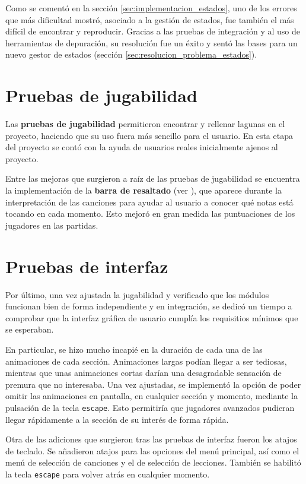 Como se comentó en la sección \ref{sec:implementacion_estados}, uno de los
errores que más dificultad mostró, asociado a la gestión de estados, fue también
el más difícil de encontrar y reproducir. Gracias a las pruebas de integración y
al uso de herramientas de depuración, su resolución fue un éxito y sentó las
bases para un nuevo gestor de estados (sección
\ref{sec:resolucion_problema_estados}).

\section{Pruebas de jugabilidad}
Las \textbf{pruebas de jugabilidad} permitieron encontrar y rellenar lagunas en
el proyecto, haciendo que su uso fuera más sencillo para el usuario. En esta
etapa del proyecto se contó con la ayuda de usuarios reales inicialmente ajenos
al proyecto.

Entre las mejoras que surgieron a raíz de las pruebas de jugabilidad se
encuentra la implementación de la \textbf{barra de resaltado} (ver
\textit{}), que aparece durante la interpretación
de las canciones para ayudar al usuario a conocer qué notas está tocando en cada
momento. Esto mejoró en gran medida las puntuaciones de los jugadores en las
partidas.

\section{Pruebas de interfaz}
Por último, una vez ajustada la jugabilidad y verificado que los módulos
funcionan bien de forma independiente y en integración, se dedicó un tiempo a
comprobar que la interfaz gráfica de usuario cumplía los requisitios mínimos que
se esperaban.

En particular, se hizo mucho incapié en la duración de cada una de las
animaciones de cada sección. Animaciones largas podían llegar a ser tediosas,
mientras que unas animaciones cortas darían una desagradable sensación de
premura que no interesaba. Una vez ajustadas, se implementó la opción de poder
omitir las animaciones en pantalla, en cualquier sección y momento, mediante la
pulsación de la tecla \texttt{escape}. Esto permitiría que jugadores avanzados
pudieran llegar rápidamente a la sección de su interés de forma rápida.

Otra de las adiciones que surgieron tras las pruebas de interfaz fueron los
atajos de teclado. Se añadieron atajos para las opciones del menú principal, así
como el menú de selección de canciones y el de selección de lecciones. También
se habilitó la tecla \texttt{escape} para volver atrás en cualquier momento.

